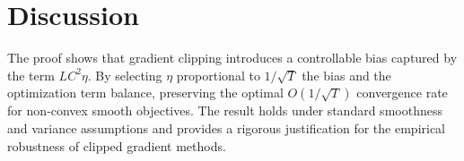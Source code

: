 \documentclass{article}
\begin{document}
\section*{Discussion}
The proof shows that gradient clipping introduces a controllable bias
captured by the term $L C^{2}\eta$.  By selecting $\eta$ proportional to
$1/\sqrt{T}$ the bias and the optimization term balance, preserving the
optimal $O(1/\sqrt{T})$ convergence rate for non‑convex smooth objectives.
The result holds under standard smoothness and variance assumptions and
provides a rigorous justification for the empirical robustness of clipped
gradient methods.
\end{document}
